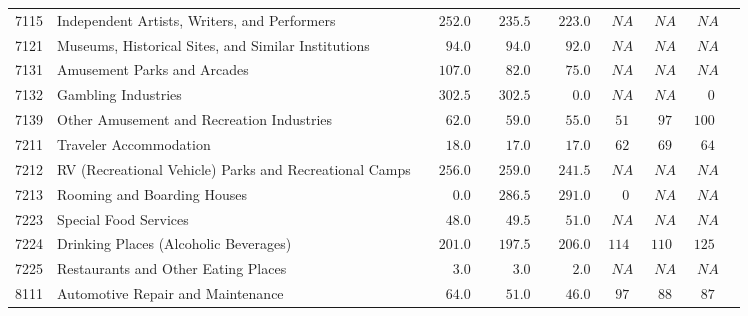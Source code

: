 \documentclass[9pt, oneside]{article}   	%
\begin{document}
\begin{longtable}{lp{3.5 in}ccccccc}
7115  & Independent Artists, Writers, and Performers & $\phantom{00}252.0$ & $\phantom{00}235.5$ & $\phantom{00}223.0$ & $\phantom{0}NA$ & $\phantom{0}NA$ & $\phantom{0}NA$ \\
7121  & Museums, Historical Sites, and Similar Institutions & $\phantom{000}94.0$ & $\phantom{000}94.0$ & $\phantom{000}92.0$ & $\phantom{0}NA$ & $\phantom{0}NA$ & $\phantom{0}NA$ \\
7131  & Amusement Parks and Arcades & $\phantom{00}107.0$ & $\phantom{000}82.0$ & $\phantom{000}75.0$ & $\phantom{0}NA$ & $\phantom{0}NA$ & $\phantom{0}NA$ \\
7132  & Gambling Industries & $\phantom{00}302.5$ & $\phantom{00}302.5$ & $\phantom{0000}0.0$ & $\phantom{0}NA$ & $\phantom{0}NA$ & $\phantom{00}0$ \\
7139  & Other Amusement and Recreation Industries & $\phantom{000}62.0$ & $\phantom{000}59.0$ & $\phantom{000}55.0$ & $\phantom{0}51$ & $\phantom{0}97$ & $100$ \\
7211  & Traveler Accommodation & $\phantom{000}18.0$ & $\phantom{000}17.0$ & $\phantom{000}17.0$ & $\phantom{0}62$ & $\phantom{0}69$ & $\phantom{0}64$ \\
7212  & RV (Recreational Vehicle) Parks and Recreational Camps & $\phantom{00}256.0$ & $\phantom{00}259.0$ & $\phantom{00}241.5$ & $\phantom{0}NA$ & $\phantom{0}NA$ & $\phantom{0}NA$ \\
7213  & Rooming and Boarding Houses & $\phantom{0000}0.0$ & $\phantom{00}286.5$ & $\phantom{00}291.0$ & $\phantom{00}0$ & $\phantom{0}NA$ & $\phantom{0}NA$ \\
7223  & Special Food Services & $\phantom{000}48.0$ & $\phantom{000}49.5$ & $\phantom{000}51.0$ & $\phantom{0}NA$ & $\phantom{0}NA$ & $\phantom{0}NA$ \\
7224  & Drinking Places (Alcoholic Beverages) & $\phantom{00}201.0$ & $\phantom{00}197.5$ & $\phantom{00}206.0$ & $114$ & $110$ & $125$ \\
7225  & Restaurants and Other Eating Places & $\phantom{0000}3.0$ & $\phantom{0000}3.0$ & $\phantom{0000}2.0$ & $\phantom{0}NA$ & $\phantom{0}NA$ & $\phantom{0}NA$ \\
8111  & Automotive Repair and Maintenance & $\phantom{000}64.0$ & $\phantom{000}51.0$ & $\phantom{000}46.0$ & $\phantom{0}97$ & $\phantom{0}88$ & $\phantom{0}87$ \\

\end{longtable}
\end{document}
